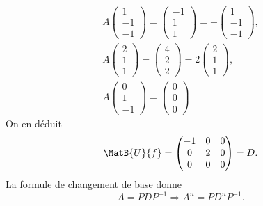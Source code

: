 \begin{multline*}
  A\begin{pmatrix}
     1 \\ -1 \\-1
   \end{pmatrix}
= \begin{pmatrix}
     -1 \\ 1 \\1
   \end{pmatrix} = -\begin{pmatrix}
     1 \\ -1 \\-1
   \end{pmatrix},\\
   A\begin{pmatrix}
     2 \\ 1 \\1
   \end{pmatrix}
= \begin{pmatrix}
     4 \\ 2 \\ 2
   \end{pmatrix} = 2\begin{pmatrix}
     2 \\ 1 \\ 1
   \end{pmatrix},\\  
   A\begin{pmatrix}
     0 \\ 1 \\ -1
   \end{pmatrix}
= \begin{pmatrix}
     0 \\ 0 \\ 0
   \end{pmatrix}
\end{multline*}
On en déduit 
\[
  \MatB{U}{f}=
  \begin{pmatrix}
    -1 & 0 & 0 \\ 0 & 2 & 0 \\ 0 & 0 & 0
  \end{pmatrix} = D.
\]
La formule de changement de base donne
\[
  A = P D P^{-1}\Rightarrow A^n = P D^n P^{-1}.
\]

